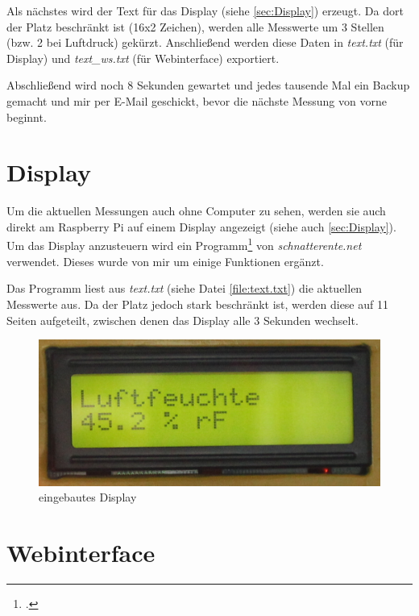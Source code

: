Als nächstes wird der Text für das Display (siehe \ref{sec:Display}) erzeugt. Da dort der Platz beschränkt ist (16x2 Zeichen), werden alle Messwerte um 3 Stellen (bzw. 2 bei Luftdruck) gekürzt. Anschließend werden diese Daten in \emph{text.txt} (für Display) und \emph{text\_ws.txt} (für Webinterface) exportiert.


Abschließend wird noch 8 Sekunden gewartet und jedes tausende Mal ein Backup gemacht und mir per E-Mail geschickt, bevor die nächste Messung von vorne beginnt.

\section{Display}
\label{sec:Software/Display}
Um die aktuellen Messungen auch ohne Computer zu sehen, werden sie auch direkt am Raspberry Pi auf einem Display angezeigt (siehe auch \ref{sec:Display}). Um das Display anzusteuern wird ein Programm\footcite{schnatterente_code} von \emph{schnatterente.net} verwendet. Dieses wurde von mir um einige Funktionen ergänzt. 

Das Programm liest aus \emph{text.txt} (siehe Datei \ref{file:text.txt}) die aktuellen Messwerte aus. Da der Platz jedoch stark beschränkt ist, werden diese auf 11 Seiten aufgeteilt, zwischen denen das Display alle 3 Sekunden wechselt.
\begin{figure}[h]
  \centering
     \includegraphics[width=\textwidth]{figures/display.jpg}
  \caption{eingebautes Display}
  \label{fig:display_alt}
\end{figure}

\section{Webinterface}
\label{sec:Webinterface}

